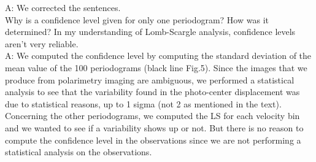 \documentclass{article}
\begin{document}
A: We corrected the sentences. \\

Why is a confidence level given for only one periodogram? How was it determined? In my
understanding of Lomb-Scargle analysis, confidence levels aren’t very reliable.\\

A: We computed the confidence level by computing the standard deviation of the mean value of the 100 periodograms (black line Fig.5). Since the images that we produce from polarimetry imaging are ambiguous, we performed a statistical analysis to see that the variability found in the photo-center displacement was due to statistical reasons, up to 1 sigma (not 2 as mentioned in the text). Concerning the other periodograms, we computed the LS for each velocity bin and we wanted to see if a variability shows up or not. But there is no reason to compute the confidence level in the observations since we are not performing a statistical analysis on the observations. 
\end{document}
